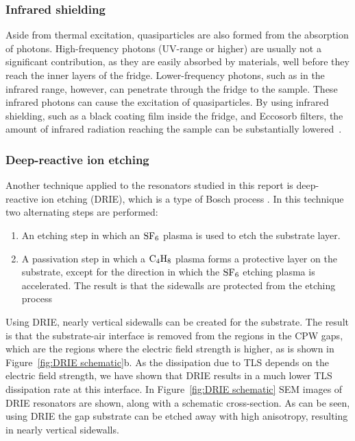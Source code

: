   \subsubsection{Infrared shielding}

  Aside from thermal excitation, quasiparticles are also formed from the absorption of photons. High-frequency photons (UV-range or higher) are usually not a significant contribution, as they are easily absorbed by materials, well before they reach the inner layers of the fridge. Lower-frequency photons, such as in the infrared range, however, can penetrate through the fridge to the sample. These infrared photons can cause the excitation of quasiparticles. By using infrared shielding, such as a black coating film inside the fridge, and Eccosorb filters, the amount of infrared radiation reaching the sample can be substantially lowered~\cite{barends2011minimizing}.



  \subsubsection{Deep-reactive ion etching}

  Another technique applied to the resonators studied in this report is deep-reactive ion etching (DRIE), which is a type of Bosch process \cite{bruno2015reducing}. In this technique two alternating steps are performed:

  \begin{enumerate}
      \item An etching step in which an $\mathrm{SF_6}$ plasma is used to etch the substrate layer.
      \item A passivation step in which a $\mathrm{C_4H_8}$ plasma forms a protective layer on the substrate, except for the direction in which the $\mathrm{SF_6}$ etching plasma is accelerated. The result is that the sidewalls are protected from the etching process
  \end{enumerate}

  Using DRIE, nearly vertical sidewalls can be created for the substrate. The result is that the substrate-air interface is removed from the regions in the CPW gaps, which are the regions where the electric field strength is higher, as is shown in Figure~\ref{fig:DRIE schematic}b. As the dissipation due to TLS depends on the electric field strength, we have shown that DRIE results in a much lower TLS dissipation rate at this interface. In Figure~\ref{fig:DRIE schematic} SEM images of DRIE resonators are shown, along with a schematic cross-section. As can be seen, using DRIE the gap substrate can be etched away with high anisotropy, resulting in nearly vertical sidewalls.

